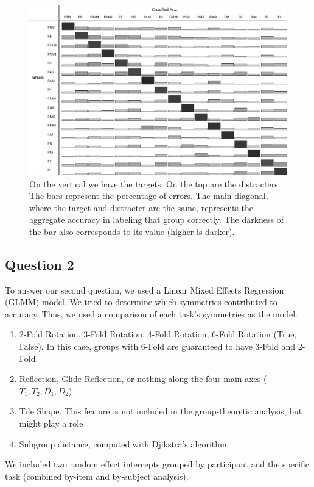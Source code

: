 \begin{figure}[!ht]
\centering
\includegraphics[width=0.9\columnwidth]{accuracies-grayscale}
\caption{On the vertical we have the targets. On the top are the distracters. The bars represent the percentage of errors. The main diagonal, where the target and distracter are the same, represents the aggregate accuracy in labeling that group correctly. The darkness of the bar also corresponds to its value (higher is darker).}
\label{fullacc}
\end{figure}

\subsection{Question 2}
To answer our second question, we used a Linear Mixed Effects Regression (GLMM) model. We tried to determine which symmetries contributed to accuracy. Thus, we used a comparison of each task's symmetries as the model.
\begin{enumerate}
\item 2-Fold Rotation, 3-Fold Rotation, 4-Fold Rotation, 6-Fold Rotation (True, False). In this case, groups with 6-Fold are guaranteed to have 3-Fold and 2-Fold.
\item Reflection, Glide Reflection, or nothing along the four main axes ($T_1, T_2, D_1, D_2$)
\item Tile Shape. This feature is not included in the group-theoretic analysis, but might play a role
\item Subgroup distance, computed with Djikstra's algorithm. 
\end{enumerate}

We included two random effect intercepts grouped by participant and the specific task (combined by-item and by-subject analysis).

